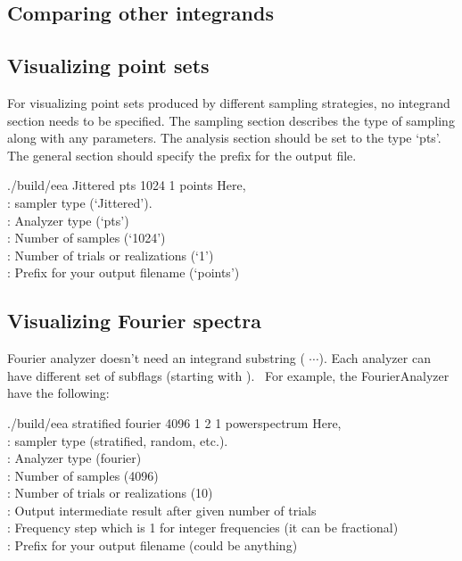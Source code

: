 \subsection{Comparing other integrands}


\subsection{Visualizing point sets}
For visualizing point sets produced by different sampling strategies, no integrand section needs to be specified. The sampling section describes the type of sampling along with any parameters. The analysis section should be set to the type `pts'. The general section should specify the prefix for the output file. 
%
\begin{tcolorbox}
./build/eea   Jittered   pts  1024  1   points
\tcblower
Here, \\
: sampler type (`Jittered'). \\
:  Analyzer type (`pts') \\
: Number of samples (`1024') \\
: Number of trials or realizations (`1') \\
: Prefix for your output filename (`points')
\end{tcolorbox}

\subsection{Visualizing Fourier spectra}
 
Fourier analyzer doesn't need an integrand substring ( $\cdots$). Each analyzer can have different set of subflags (starting with \cdashs). \
For example, the FourierAnalyzer have the following:
%
\begin{tcolorbox}
./build/eea   stratified   fourier  4096  1   2  1   powerspectrum
\tcblower
Here, \\
: sampler type (stratified, random, etc.). \\
:  Analyzer type (fourier) \\
: Number of samples (4096) \\
: Number of trials or realizations (10) \\
:  Output intermediate result after given number of trials  \\
\cdashs{wstep}: Frequency step which is 1 for integer frequencies (it can be fractional)\\
\cdashs{ofile}: Prefix for your output filename (could be anything)
\end{tcolorbox}
%


